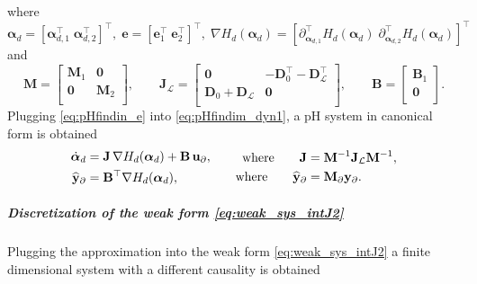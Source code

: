 where $\bm{\alpha}_{d}= [\bm{\alpha}_{d, 1}^\top \; \bm{\alpha}_{d, 2}^\top]^\top, \; \mathbf{e}= [\mathbf{e}_1^\top \; \mathbf{e}_2^\top]^\top, \; \nabla H_d(\bm{\alpha}_d) = [\partial_{\bm{\alpha}_{d, 1}}^\top H_d(\bm{\alpha}_d) \; \partial_{\bm{\alpha}_{d, 2}}^\top H_d(\bm{\alpha}_d)]^\top$ and 
\begin{equation}
\mathbf{M} = \begin{bmatrix}
\mathbf{M}_1 & \mathbf{0} \\
\mathbf{0} & \mathbf{M}_2 \\
\end{bmatrix}, \qquad 
\mathbf{J}_\mathcal{L}= \begin{bmatrix}
\mathbf{0} & -\mathbf{D}_{0}^\top - \mathbf{D}_{\mathcal{L}}^\top \\
\mathbf{D}_{0} + \mathbf{D}_{\mathcal{L}} & \mathbf{0} \\
\end{bmatrix}, \qquad
\mathbf{B} =
\begin{bmatrix}
\mathbf{B}_1\\
\mathbf{0}\\
\end{bmatrix}.
\end{equation}
Plugging \eqref{eq:pHfindin_e} into \eqref{eq:pHfindim_dyn1}, a pH system in canonical form is obtained
\begin{equation}
	\begin{aligned}
	\dot{\bm{\alpha}}_{d} &= \mathbf{J}\, \nabla H_d(\bm{\alpha}_d) + \mathbf{B}\, \mathbf{u}_\partial,\\
	\widehat{\mathbf{y}}_\partial &= \mathbf{B}^\top \nabla H_d(\bm{\alpha}_d), 
	\end{aligned}
	\begin{aligned}
	\qquad \text{where} \qquad \mathbf{J} &= \mathbf{M}^{-1} \mathbf{J}_\mathcal{L} \mathbf{M}^{-1},\\
	\qquad \text{where} \qquad \widehat{\mathbf{y}}_\partial &= \mathbf{M}_\partial \mathbf{y}_\partial.
	\end{aligned}
\end{equation}
\subparagraph{Discretization of the weak form \eqref{eq:weak_sys_intJ2}}
Plugging the approximation into the weak form \eqref{eq:weak_sys_intJ2} a finite dimensional system with a different causality is obtained

